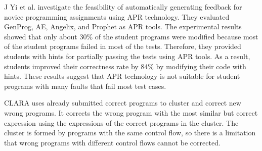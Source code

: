 \documentclass[10pt,conference]{IEEEtran}
\begin{document}
        J Yi et al.\cite{yi2017feasibility} investigate the feasibility of automatically generating feedback for novice programming assignments using APR technology. They evaluated GenProg\cite{le2011genprog}, AE\cite{weimer2013leveraging}, Angelix\cite{mechtaev2016angelix}, and Prophet\cite{long2016automatic} as APR tools. The experimental results showed that only about 30\% of the student programs were modified because most of the student programs failed in most of the tests. Therefore, they provided students with hints for partially passing the tests using APR tools. As a result, students improved their correctness rate by 84\% by modifying their code with hints. These results suggest that APR technology is not suitable for student programs with many faults that fail most test cases.
        
        
        CLARA\cite{gulwani2018automated} uses already submitted correct programs to cluster and correct new wrong programs. It corrects the wrong program with the most similar but correct expression using the expressions of the correct programs in the cluster. The cluster is formed by programs with the same control flow, so there is a limitation that wrong programs with different control flows cannot be corrected.
        
\end{document}
